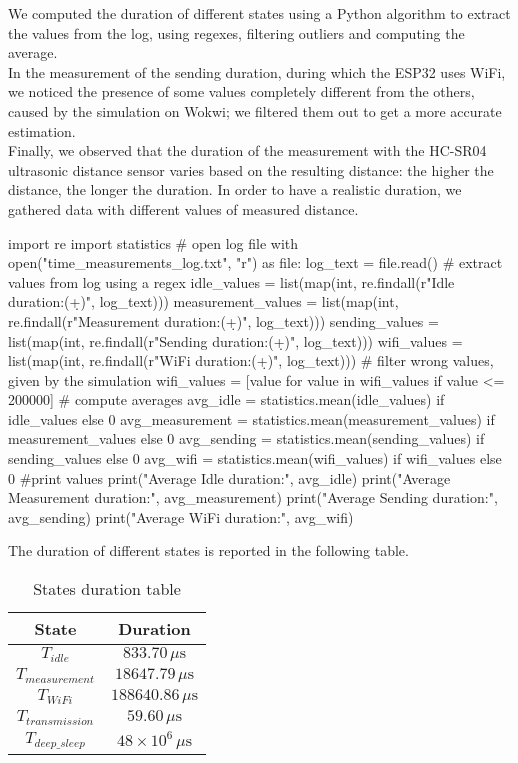 We computed the duration of different states using a Python algorithm to extract the values from the log, using regexes, filtering outliers and computing the average. \\
In the measurement of the sending duration, during which the ESP32 uses WiFi, we noticed the presence of some values completely different from the others, caused by the simulation on Wokwi; we filtered them out to get a more accurate estimation. \\
Finally, we observed that the duration of the measurement with the HC-SR04 ultrasonic distance sensor varies based on the resulting distance: the higher the distance, the longer the duration. In order to have a realistic duration, we gathered data with different values of measured distance.

\begin{python}
import re
import statistics
# open log file
with open("time_measurements_log.txt", "r") as file:
    log_text = file.read()
# extract values from log using a regex 
idle_values = list(map(int, re.findall(r"Idle duration:\s*(\d+)", log_text)))
measurement_values = list(map(int, re.findall(r"Measurement duration:\s*(\d+)", log_text)))
sending_values = list(map(int, re.findall(r"Sending duration:\s*(\d+)", log_text)))
wifi_values = list(map(int, re.findall(r"WiFi duration:\s*(\d+)", log_text)))
# filter wrong values, given by the simulation
wifi_values = [value for value in wifi_values if value <= 200000]
# compute averages
avg_idle = statistics.mean(idle_values) if idle_values else 0
avg_measurement = statistics.mean(measurement_values) if measurement_values else 0
avg_sending = statistics.mean(sending_values) if sending_values else 0
avg_wifi = statistics.mean(wifi_values) if wifi_values else 0
#print values
print("Average Idle duration:", avg_idle)
print("Average Measurement duration:", avg_measurement)
print("Average Sending duration:", avg_sending)
print("Average WiFi duration:", avg_wifi)
\end{python}

The duration of different states is reported in the following table.

\begin{table}[H]
\centering 
\begin{tabular}{| c | c |}
	\hline 
	\rowcolor{bluepoli!40}
	\textbf{State} & \textbf{Duration}\T\B \\
	\hline 
	$T_{idle}$ & $833.70\,\mu\text{s}$ \T\B\\
	$T_{measurement}$ & $18647.79\,\mu\text{s}$ \T\B\\
	$T_{WiFi}$ & $188640.86\,\mu\text{s}$ \T\B\\
	$T_{transmission}$ & $59.60\,\mu\text{s}$ \T\B\\
	$T_{deep\_sleep}$  & $48\times10^6\,\mu\text{s}$ \T\B\\
	\hline
\end{tabular}
\\[10pt]
\caption{States duration table}
\label{table:states_duration_table}
\end{table}

